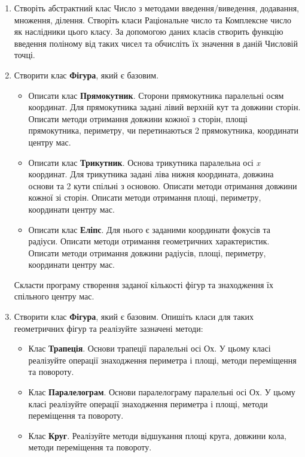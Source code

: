 \documentclass[]{article}
\begin{document}
\begin{enumerate}
\item
Створіть абстрактний клас Число з методами введення/виведення,
додавання, множення, ділення. Створіть класи Раціональне число та
Комплексне число як наслідники цього класу. За допомогою даних класів
створить функцію введення поліному від таких чисел та обчисліть їх
значення в даній Числовій точці.

\item
  Створити клас \textbf{Фігура}, який є базовим.

  \begin{itemize}
  \item
    Описати клас \textbf{Прямокутник}. Сторони прямокутника паралельні
    осям координат. Для прямокутника задані лівий верхній кут та довжини
    сторін. Описати методи отримання довжини кожної з сторін, площі
    прямокутника, периметру, чи перетинаються 2 прямокутника, координати
    центру мас.
  \item
    Описати клас \textbf{Трикутник}. Основа трикутника паралельна осі
    \emph{x} координат. Для трикутника задані ліва нижня координата,
    довжина основи та 2 кути спільні з основою. Описати методи отримання
    довжини кожної зі сторін. Описати методи отримання площі, периметру,
    координати центру мас.
  \item
    Описати клас \textbf{Еліпс}. Для нього є заданими координати фокусів
    та радіуси. Описати методи отримання геометричних характеристик.
    Описати методи отримання довжини радіусів, площі, периметру,
    координати центру мас.
  \end{itemize}

  Скласти програму створення заданої кількості фігур та знаходження їх
  спільного центру мас.

\item
  Створити клас \textbf{Фігура}, який є базовим. Опишіть класи для таких
  геометричних фігур та реалізуйте зазначені методи:

  \begin{itemize}
  \item
    Клас \textbf{Трапеція}. Основи трапеції паралельні осі Ох. У цьому
    класі реалізуйте операції знаходження периметра і площі, методи
    переміщення та повороту.
  \item
    Клас \textbf{Паралелограм}. Основи паралелограму паралельні осі Ох.
    У цьому класі реалізуйте операції знаходження периметра і площі,
    методи переміщення та повороту.
  \item
    Клас \textbf{Круг}. Реалізуйте методи відшукання площі круга,
    довжини кола, методи переміщення та повороту.
  \end{itemize}


\end{enumerate}
\end{document}

